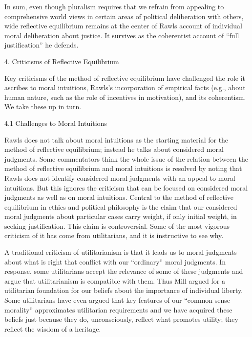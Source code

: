\documentclass[]{article}
\begin{document}
In sum, even though pluralism requires that we refrain from appealing to
comprehensive world views in certain areas of political deliberation
with others, wide reflective equilibrium remains at the center of Rawls
account of individual moral deliberation about justice. It survives as
the coherentist account of ``full justification'' he defends.

\protect\hypertarget{CriRefEqu}{}{4. Criticisms of Reflective
Equilibrium}

Key criticisms of the method of reflective equilibrium have challenged
the role it ascribes to moral intuitions, Rawls's incorporation of
empirical facts (e.g., about human nature, such as the role of
incentives in motivation), and its coherentism. We take these up in
turn.

\protect\hypertarget{ChaMorInt}{}{4.1 Challenges to Moral Intuitions}

Rawls does not talk about moral intuitions as the starting material for
the method of reflective equilibrium; instead he talks about considered
moral judgments. Some commentators think the whole issue of the relation
between the method of reflective equilibrium and moral intuitions is
resolved by noting that Rawls does not identify considered moral
judgments with an appeal to moral intuitions. But this ignores the
criticism that can be focused on considered moral judgments as well as
on moral intuitions. Central to the method of reflective equilibrium in
ethics and political philosophy is the claim that our considered moral
judgments about particular cases carry weight, if only initial weight,
in seeking justification. This claim is controversial. Some of the most
vigorous criticism of it has come from utilitarians, and it is
instructive to see why.

A traditional criticism of utilitarianism is that it leads us to moral
judgments about what is right that conflict with our ``ordinary'' moral
judgments. In response, some utilitarians accept the relevance of some
of these judgments and argue that utilitarianism is compatible with
them. Thus Mill argued for a utilitarian foundation for our beliefs
about the importance of individual liberty. Some utilitarians have even
argued that key features of our ``common sense morality'' approximates
utilitarian requirements and we have acquired these beliefs just because
they do, unconsciously, reflect what promotes utility; they reflect the
wisdom of a heritage.
\end{document}
